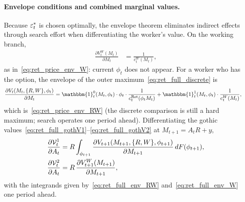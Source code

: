 \paragraph{Envelope conditions and combined marginal values.}
Because $\varepsilon_t^{\ast}$ is chosen optimally, the envelope theorem eliminates indirect effects through search effort when differentiating the worker's value. On the working branch,
\begin{align}
	\frac{\partial V_t^{W}(M_t)}{\partial M_t}
	&= \frac{1}{c_t^{W}(M_t)},
	\label{eq:ret_full_env_W}
\end{align}
as in~\eqref{eq:ret_price_env_W}: current $\phi_t$ does not appear. For a worker who has the option, the envelope of the outer maximum~\eqref{eq:ret_full_discrete} is
\begin{align}
	\frac{\partial V_t(M_t,\{R,W\},\phi_t)}{\partial M_t}
	&= \mathbbm{1}_t^{0}(M_t,\phi_t)\cdot\phi_t\cdot\frac{1}{c_t^{\Ret}(\phi_t M_t)}
	+\mathbbm{1}_t^{1}(M_t,\phi_t)\cdot\frac{1}{c_t^{W}(M_t)},
	\label{eq:ret_full_env_RW}
\end{align}
which is~\eqref{eq:ret_price_env_RW} (the discrete comparison is still a hard maximum; search operates one period ahead). Differentiating the gothic values~\eqref{eq:ret_full_gothV1}--\eqref{eq:ret_full_gothV2} at $M_{t+1}=A_t R+y$,
\begin{align}
	\frac{\partial\mathcal{V}_t^{1}}{\partial A_t}
	&= R\int_{\phi_{t+1}}
	\frac{\partial V_{t+1}(M_{t+1},\{R,W\},\phi_{t+1})}{\partial M_{t+1}}
	\,dF(\phi_{t+1}),
	\label{eq:ret_full_dV1}\\
	\frac{\partial\mathcal{V}_t^{2}}{\partial A_t}
	&= R\,
	\frac{\partial V_{t+1}^{W}(M_{t+1})}{\partial M_{t+1}},
	\label{eq:ret_full_dV2}
\end{align}
with the integrands given by~\eqref{eq:ret_full_env_RW} and~\eqref{eq:ret_full_env_W} one period ahead.

